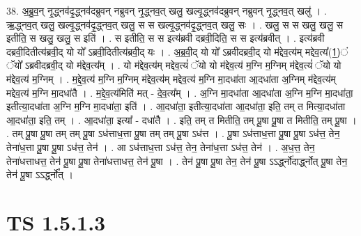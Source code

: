 \documentclass[17pt]{extarticle}
\begin{document}
38. अ॒ब्रु॒व॒न् नृ॒द्ध्नव॑दृ॒द्ध्नव॑दब्रुवन् नब्रुवन् नृ॒द्ध्नव॒त् खलु॒ खल्वृ॒द्ध्नव॑दब्रुवन् नब्रुवन् नृ॒द्ध्नव॒त् खलु॑ । . ऋ॒द्ध्नव॒त् खलु॒ खल्वृ॒द्ध्नव॑दृ॒द्ध्नव॒त् खलु॒ स स खल्वृ॒द्ध्नव॑दृ॒द्ध्नव॒त् खलु॒ सः । . खलु॒ स स खलु॒ खलु॒ स इतीति॒ स खलु॒ खलु॒ स इति॑ । . स इतीति॒ स स इत्य॑ब्रवी दब्रवी॒दिति॒ स स इत्य॑ब्रवीत् । . इत्य॑ब्रवी दब्रवी॒दितीत्य॑ब्रवी॒द् यो यो᳚ ऽब्रवी॒दितीत्य॑ब्रवी॒द् यः । . अ॒ब्र॒वी॒द् यो यो᳚ ऽब्रवीदब्रवी॒द् यो म॑द्देव॒त्य॑म् मद्देव॒त्य᳚(1॒)ं ॅयो᳚ ऽब्रवीदब्रवी॒द् यो म॑द्देव॒त्य᳚म् । . यो म॑द्देव॒त्य॑म् मद्देव॒त्यं॑ ॅयो यो म॑द्देव॒त्य॑ म॒ग्नि म॒ग्निम् म॑द्देव॒त्यं॑ ॅयो यो म॑द्देव॒त्य॑ म॒ग्निम् । . म॒द्दे॒व॒त्य॑ म॒ग्नि म॒ग्निम् म॑द्देव॒त्य॑म् मद्देव॒त्य॑ म॒ग्नि मा॒दधा॑ता आ॒दधा॑ता अ॒ग्निम् म॑द्देव॒त्य॑म् मद्देव॒त्य॑ म॒ग्नि मा॒दधा॑तै । . म॒द्दे॒व॒त्य॑मिति॑ मत् - दे॒व॒त्य᳚म् । . अ॒ग्नि मा॒दधा॑ता आ॒दधा॑ता अ॒ग्नि म॒ग्नि मा॒दधा॑ता॒ इतीत्या॒दधा॑ता अ॒ग्नि म॒ग्नि मा॒दधा॑ता॒ इति॑ । . आ॒दधा॑ता॒ इतीत्या॒दधा॑ता आ॒दधा॑ता॒ इति॒ तम् त मित्या॒दधा॑ता आ॒दधा॑ता॒ इति॒ तम् । . आ॒दधा॑ता॒ इत्या᳚ - दधा॑तै । . इति॒ तम् त मितीति॒ तम् पू॒षा पू॒षा त मितीति॒ तम् पू॒षा । . तम् पू॒षा पू॒षा तम् तम् पू॒षा ऽध॑त्ताध॒त्ता पू॒षा तम् तम् पू॒षा ऽध॑त्त । . पू॒षा ऽध॑त्ताध॒त्ता पू॒षा पू॒षा ऽध॑त्त॒ तेन॒ तेना॑ध॒त्ता पू॒षा पू॒षा ऽध॑त्त॒ तेन॑ । . आ ऽध॑त्ताध॒त्ता ऽध॑त्त॒ तेन॒ तेना॑ध॒त्ता ऽध॑त्त॒ तेन॑ । . अ॒ध॒त्त॒ तेन॒ तेना॑धत्ताधत्त॒ तेन॑ पू॒षा पू॒षा तेना॑धत्ताधत्त॒ तेन॑ पू॒षा । . तेन॑ पू॒षा पू॒षा तेन॒ तेन॑ पू॒षा ऽऽर्द्ध्नो॑दार्द्ध्नोत् पू॒षा तेन॒ तेन॑ पू॒षा ऽऽर्द्ध्नो᳚त् । \newline
\pagebreak
{}

\section{ TS 1.5.1.3 }
\end{document}
